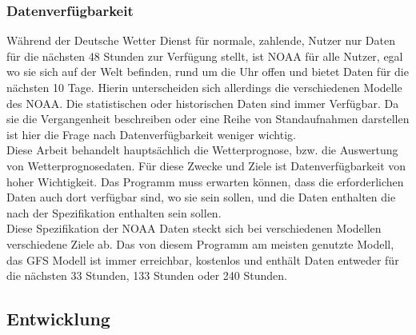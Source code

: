 \subsubsection{Datenverfügbarkeit} %
Während der Deutsche Wetter Dienst für normale, zahlende, Nutzer nur Daten
für die nächsten 48 Stunden zur Verfügung stellt, ist NOAA für alle Nutzer,
egal wo sie sich auf der Welt befinden, rund um die Uhr offen und bietet Daten
für die nächsten 10 Tage. Hierin unterscheiden sich allerdings die verschiedenen
Modelle des NOAA. Die statistischen oder historischen Daten sind immer Verfügbar.
Da sie die Vergangenheit beschreiben oder eine Reihe von Standaufnahmen darstellen
ist hier die Frage nach Datenverfügbarkeit weniger wichtig.\\
Diese Arbeit behandelt hauptsächlich die Wetterprognose, bzw. die Auswertung
von Wetterprognosedaten. Für diese Zwecke und Ziele ist Datenverfügbarkeit von
hoher Wichtigkeit. Das Programm muss erwarten können,
dass die erforderlichen Daten auch
dort verfügbar sind, wo sie sein sollen,
und die Daten enthalten die nach der
Spezifikation enthalten sein sollen.\\
Diese Spezifikation der NOAA Daten steckt sich bei verschiedenen Modellen
verschiedene Ziele ab.
Das von diesem Programm am meisten genutzte Modell,
das GFS Modell ist immer erreichbar,
kostenlos und enthält Daten entweder für die nächsten 33 Stunden,
133 Stunden oder 240 Stunden.

\subsection{Entwicklung} %

